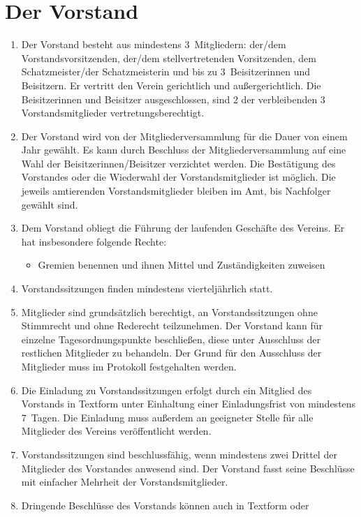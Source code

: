 \documentclass[a4paper,12pt]{scrartcl}
\begin{document}
\section{Der Vorstand}
\begin{enumerate}
  \item Der Vorstand besteht aus mindestens 3~Mitgliedern: der/dem
    Vorstandsvorsitzenden, der/dem stellvertretenden Vorsitzenden, dem 
    Schatzmeister/der Schatzmeisterin und bis zu 3~Beisitzerinnen und 
    Beisitzern. Er vertritt den Verein gerichtlich und außergerichtlich. Die 
    Beisitzerinnen und Beisitzer ausgeschlossen, sind 2 der verbleibenden 3 
    Vorstandsmitglieder vertretungsberechtigt.
  \item Der Vorstand wird von der Mitgliederversammlung für die Dauer von einem
    Jahr gewählt. Es kann durch Beschluss der Mitgliederversammlung auf eine
    Wahl der Beisitzerinnen/Beisitzer verzichtet werden. Die Bestätigung des 
    Vorstandes oder die Wiederwahl der Vorstandsmitglieder ist möglich. Die
    jeweils amtierenden Vorstandsmitglieder bleiben im Amt, bis Nachfolger
    gewählt sind.
  \item Dem Vorstand obliegt die Führung der laufenden Geschäfte des Vereins. Er
    hat insbesondere folgende Rechte:
    \begin{itemize}
      \item Gremien benennen und ihnen Mittel und Zuständigkeiten zuweisen
    \end{itemize}
  \item Vorstandssitzungen finden mindestens vierteljährlich statt.
  \item Mitglieder sind grundsätzlich berechtigt, an Vorstandssitzungen ohne
    Stimmrecht und ohne Rederecht teilzunehmen. Der Vorstand kann für einzelne
    Tagesordnungspunkte beschließen, diese unter Ausschluss der restlichen
    Mitglieder zu behandeln. Der Grund für den Ausschluss der Mitglieder muss im
    Protokoll festgehalten werden.
  \item Die Einladung zu Vorstandssitzungen erfolgt durch ein Mitglied des
    Vorstands in Textform unter Einhaltung einer Einladungsfrist von mindestens
    7~Tagen. Die Einladung muss außerdem an geeigneter Stelle für alle Mitglieder
    des Vereins veröffentlicht werden.
  \item Vorstandssitzungen sind beschlussfähig, wenn mindestens zwei Drittel der
    Mitglieder des Vorstandes anwesend sind. Der Vorstand fasst seine Beschlüsse
    mit einfacher Mehrheit der Vorstandsmitglieder.
  \item Dringende Beschlüsse des Vorstands können auch in Textform oder

\end{enumerate}
\end{document}
